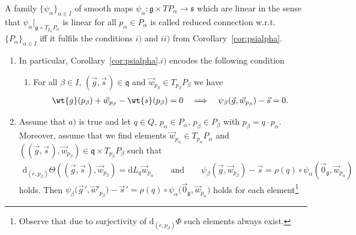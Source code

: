 \documentclass[pdftex]{sigma}
\numberwithin{equation}{section}
\begin{document}
\begin{Definition}
A family $\{\psi_\alpha\}_{\alpha\in I}$ of smooth maps $\psi_\alpha\colon \mathfrak{g}\times TP_\alpha \rightarrow
\mathfrak{s}$ which are linear in the sense that $\psi_\alpha|_{\mathfrak{g}\times T_{p_\alpha}P_\alpha }$ is linear for
all $p_\alpha\in P_\alpha$ is called reduced connection w.r.t.~$\{P_\alpha\}_{\alpha\in I}$ if\/f it fulf\/ils the
conditions $i)$ and $ii)$ from Corollary~\ref{cor:psialpha}.
\end{Definition}
\begin{Remark}\label{rem:Psialphaconderkl}\quad
\begin{enumerate}\itemsep=0pt
\item[1)] In particular, Corollary~\ref{cor:psialpha}.$i)$ encodes the following condition
\begin{enumerate}\itemsep=0pt
\item[$a)$] For all $\beta \in I$, $(\vec{g},\vec{s}\hspace{1pt})\in \mathfrak{q}$ and $\vec{w}_{p_\beta}\in
T_{p_\beta}P_\beta$ we have
\begin{gather*}
\wt{g}(p_\beta) +\vec{w}_{p_\beta}-\wt{s}(p_\beta)=0
\quad
\Longrightarrow
\quad
\psi_\beta(\vec{g},\vec{w}_{p_\beta})-\vec{s}=0.
\end{gather*}
\end{enumerate}
\item[2)] Assume that $a)$ is true and let $q\in Q$, $p_\alpha\in P_\alpha$, $p_\beta \in
P_\beta$ with $p_\beta=q\cdot p_\alpha$.
Moreover, assume that we f\/ind elements $\vec{w}_{p_\alpha}\in T_{p_\alpha}P_\alpha$ and
$((\vec{g},\vec{s}\hspace{1pt}),\vec{w}_{p_\beta})\in \mathfrak{q}\times T_{p_\beta}P_\beta$ such that
\begin{gather*}
\mathrm{d}_{(e,p_\beta)}\Theta((\vec{g},\vec{s}\hspace{1pt}),\vec{w}_{p_\beta})=\mathrm{d} L_q\vec{w}_{p_\alpha}
\qquad
\text{and}
\qquad
\psi_\beta(\vec{g},\vec{w}_{p_\beta})-\vec{s}=\rho(q)\circ\psi_\alpha(\vec{0}_{\mathfrak{g}},\vec{w}_{p_\alpha})
\end{gather*}
holds.
Then
$\psi_\beta\big(\vec{g}\hspace{1pt}{}',\vec{w}'_{p_\beta}\big)-\vec{s}\hspace{1pt}{}'
=\rho(q)\circ\psi_\alpha\big(\vec{0}_{\mathfrak{g}},\vec{w}_{p_\alpha}\big)$
holds for each element\footnote{Observe that due to surjectivity of $\mathrm{d}_{(e,p_\beta)}\Phi$ such elements always exist.}

\end{enumerate}
\end{Remark}
\end{document}
